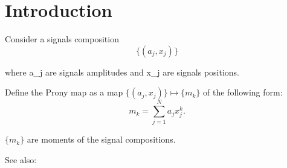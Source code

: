 \section{Introduction}
Consider a signals composition
$$
\{ (a_j, x_j) \}
$$

where a_j are signals amplitudes and x_j are signals positions. \par

Define the Prony map as a map $\{ (a_j, x_j) \} \mapsto \{m_k\}$ of the following form:
$$
m_k = \sum_{j=1}^N a_j x_j^k.
$$
  
$\{m_k\}$ are moments of the signal compositions.

See also: \cite{2015arXiv150206932A}
  
  
  
  
  
  
  